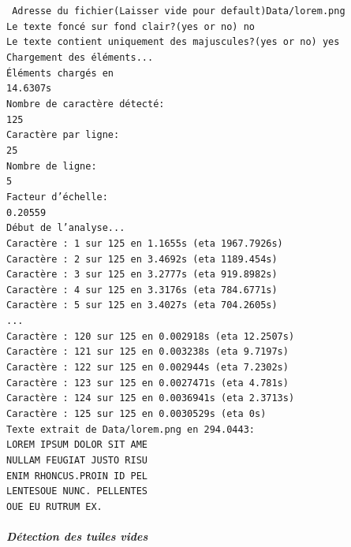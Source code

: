 \documentclass[a4paper,12pt,titlepage]{report}
\begin{document}
	\texttt{
	Adresse du fichier(Laisser vide pour default)Data/lorem.png\\
Le texte foncé sur fond clair?(yes or no) no\\
Le texte contient uniquement des majuscules?(yes or no) yes\\
Chargement des éléments...\\
Éléments chargés en \\
14.6307s\\
Nombre de caractère détecté:\\
 125\\
Caractère par ligne:\\
 25\\
Nombre de ligne:\\
 5\\
Facteur d'échelle:\\
 0.20559\\
Début de l'analyse...\\
Caractère : 1 sur 125 en 1.1655s (eta 1967.7926s)\\
Caractère : 2 sur 125 en 3.4692s (eta 1189.454s)\\
Caractère : 3 sur 125 en 3.2777s (eta 919.8982s)\\
Caractère : 4 sur 125 en 3.3176s (eta 784.6771s)\\
Caractère : 5 sur 125 en 3.4027s (eta 704.2605s)\\
	...\\
Caractère : 120 sur 125 en 0.002918s (eta 12.2507s)\\
Caractère : 121 sur 125 en 0.003238s (eta 9.7197s)\\
Caractère : 122 sur 125 en 0.002944s (eta 7.2302s)\\
Caractère : 123 sur 125 en 0.0027471s (eta 4.781s)\\
Caractère : 124 sur 125 en 0.0036941s (eta 2.3713s)\\
Caractère : 125 sur 125 en 0.0030529s (eta 0s)\\
Texte extrait de Data/lorem.png en 294.0443:\\
LOREM IPSUM DOLOR SIT AME\\
NULLAM FEUGIAT JUSTO RISU\\
ENIM RHONCUS.PROIN ID PEL\\
LENTESOUE NUNC. PELLENTES\\
OUE EU RUTRUM EX.\\}

\subparagraph{Détection des tuiles vides}
\end{document}
